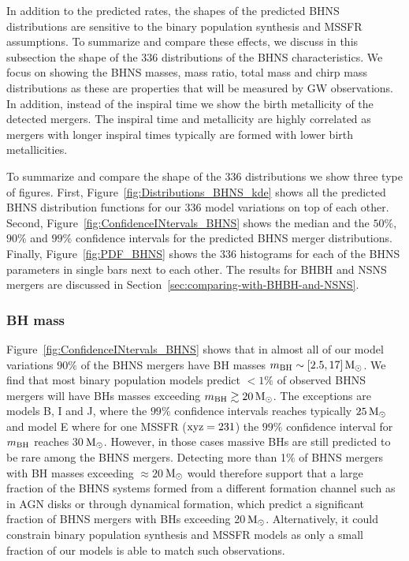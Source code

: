 \documentclass[twocolumn]{aastex63}
\newcommand\bhnsSingle{BHNS\xspace}
\newcommand{\Msun}{\ensuremath{\,\rm{M}_{\odot}}\xspace}
\newcommand{\mbhf}{\ensuremath{m_{\rm{BH}}}\xspace}
\newcommand{\Nmodels}{\ensuremath{336}\xspace}
\begin{document}
In addition to the predicted rates, the shapes of the predicted \bhnsSingle distributions are sensitive to the binary population synthesis  and \ac{MSSFR} assumptions. To summarize and compare these effects, we discuss in this subsection the  shape of the \Nmodels distributions of the \bhnsSingle characteristics. We focus on showing the \bhnsSingle masses, mass ratio, total mass and chirp mass distributions as these are properties that will be measured by \ac{GW} observations. In addition, instead of the inspiral time we show the birth metallicity of the detected mergers.  The inspiral time and metallicity are highly correlated as mergers with longer inspiral times typically are formed with lower birth  metallicities. 


To summarize and compare the shape of the \Nmodels distributions we show three type of figures. First, Figure~\ref{fig:Distributions_BHNS_kde} shows all the predicted \bhnsSingle   distribution functions for our \Nmodels model variations on top of each other.   Second, Figure~\ref{fig:ConfidenceINtervals_BHNS} shows  the median and the $50\%$, $90\%$ and $99\%$ confidence intervals for  the predicted \bhnsSingle merger distributions. 
Finally,   Figure~\ref{fig:PDF_BHNS} shows the \Nmodels histograms for each of the   \bhnsSingle parameters in single bars next to each other.  The results for \ac{BHBH} and \ac{NSNS} mergers are discussed in Section~\ref{sec:comparing-with-BHBH-and-NSNS}.




\subsubsection{BH mass}
%
 Figure~\ref{fig:ConfidenceINtervals_BHNS} shows that in almost all of  our model variations  $90\%$ of the \bhnsSingle mergers have \ac{BH} masses  $\mbhf \sim [2.5, 17]\Msun$. We find that  most binary population models predict $<1\%$ of observed \bhnsSingle mergers will have \acp{BH} masses exceeding $\mbhf \gtrsim 20\Msun$. The exceptions are models B, I and J, where the $99\%$ confidence intervals reaches typically $25\Msun$ and model E where for one \ac{MSSFR} ($\rm{xyz}=231$) the $99\%$ confidence interval for $\mbhf$ reaches $30$\Msun. However, in those cases massive \acp{BH}   
 are still predicted to be rare among the  \bhnsSingle mergers. 
 Detecting more than 1$\%$ of   \bhnsSingle mergers with \ac{BH} masses exceeding $\approx 20$\Msun   would therefore support that a large fraction of the \bhnsSingle systems  formed from a different  formation channel such as in AGN disks or through dynamical formation, which predict a significant fraction of  \bhnsSingle mergers with  \acp{BH} exceeding 20\Msun \citep[][]{2020arXiv200302277R}.   Alternatively, it could constrain binary population synthesis and \ac{MSSFR} models as only a small fraction of our models is able to match such observations. 
 
\end{document}
